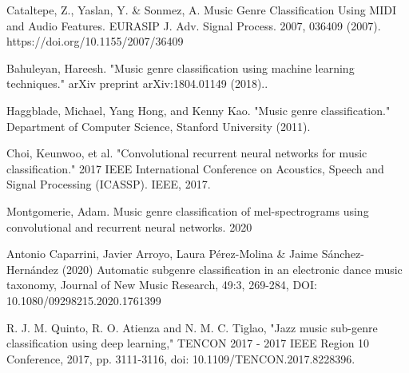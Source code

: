 \documentclass[letterpaper, 12 pt, conference]{ieeeconf}  %
\begin{document}
\begin{thebibliography}{99}



 Cataltepe, Z., Yaslan, Y. & Sonmez, A. Music Genre Classification Using MIDI and Audio Features. EURASIP J. Adv. Signal Process. 2007, 036409 (2007). https://doi.org/10.1155/2007/36409

 Bahuleyan, Hareesh. "Music genre classification using machine learning techniques." arXiv preprint arXiv:1804.01149 (2018)..

 Haggblade, Michael, Yang Hong, and Kenny Kao. "Music genre classification." Department of Computer Science, Stanford University (2011). 

 Choi, Keunwoo, et al. "Convolutional recurrent neural networks for music classification." 2017 IEEE International Conference on Acoustics, Speech and Signal Processing (ICASSP). IEEE, 2017.


 Montgomerie, Adam.  Music genre classification of mel-spectrograms using convolutional and
recurrent neural networks. 2020

  Antonio Caparrini, Javier Arroyo, Laura Pérez-Molina & Jaime Sánchez-Hernández (2020) Automatic subgenre classification in an electronic dance music taxonomy, Journal of New Music Research, 49:3, 269-284, DOI: 10.1080/09298215.2020.1761399



 R. J. M. Quinto, R. O. Atienza and N. M. C. Tiglao, "Jazz music sub-genre classification using deep learning," TENCON 2017 - 2017 IEEE Region 10 Conference, 2017, pp. 3111-3116, doi: 10.1109/TENCON.2017.8228396.


\end{thebibliography}
\end{document}
